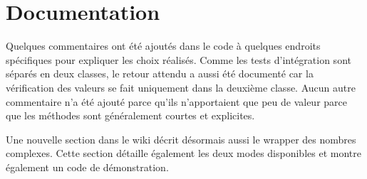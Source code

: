 \section{Documentation}

Quelques commentaires ont été ajoutés dans le code à quelques endroits spécifiques pour expliquer les choix réalisés. Comme les tests d'intégration sont séparés en deux classes, le retour attendu a aussi été documenté car la vérification des valeurs se fait uniquement dans la deuxième classe. Aucun autre commentaire n'a été ajouté parce qu'ils n'apportaient que peu de valeur parce que les méthodes sont généralement courtes et explicites.

Une nouvelle section dans le wiki décrit désormais aussi le wrapper des nombres complexes. Cette section détaille également les deux modes disponibles et montre également un code de démonstration.